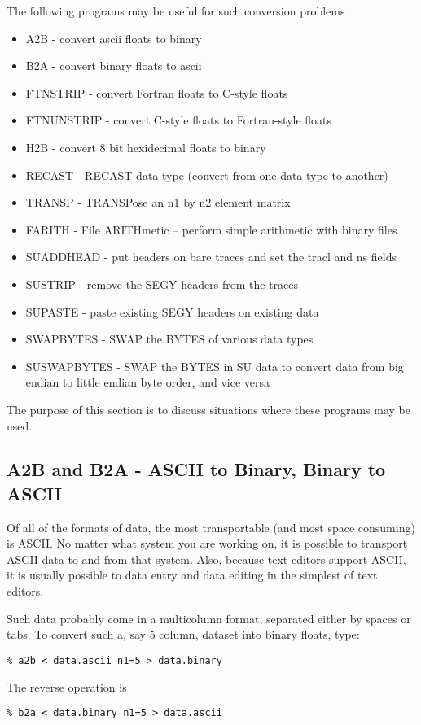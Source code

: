 {{{The following programs may be useful for such conversion problems
\begin{itemize}
\item A2B - convert ascii floats to binary
\item B2A - convert binary floats to ascii
\item FTNSTRIP - convert Fortran floats to C-style floats 
\item FTNUNSTRIP - convert C-style floats to Fortran-style floats
\item H2B - convert 8 bit hexidecimal floats to binary
\item RECAST - RECAST data type (convert from one data type to another)
\item TRANSP - TRANSPose an n1 by n2 element matrix 
\item FARITH - File ARITHmetic -- perform simple arithmetic with binary files 
\item SUADDHEAD - put headers on bare traces and set the tracl and ns fields 
\item SUSTRIP - remove the SEGY headers from the traces 
\item SUPASTE - paste existing SEGY headers on existing data
\item SWAPBYTES - SWAP the BYTES of various  data types
\item SUSWAPBYTES - SWAP the BYTES in SU data to convert data from big endian
to little endian byte order, and vice versa
\end{itemize}

The purpose of this section is to discuss situations where these
programs may be used.
\subsection{A2B and B2A - ASCII to Binary, Binary to ASCII}

Of all of the formats of data, the most transportable (and most 
space consuming) is ASCII. No matter what system you are working
on, it is possible to transport ASCII data to and from that system.
Also, because text editors support ASCII, it is usually possible to
data entry and data editing in the simplest of text editors.

Such data probably come in a multicolumn format, separated either
by spaces or tabs. To convert such a, say 5 column, dataset into
binary floats, type:
{\small\begin{verbatim}
% a2b < data.ascii n1=5 > data.binary 
\end{verbatim}}\noindent
The reverse operation is
{\small\begin{verbatim}
% b2a < data.binary n1=5 > data.ascii 
\end{verbatim}}\noindent

}}}
